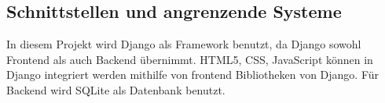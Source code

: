 \subsection{Schnittstellen und angrenzende Systeme} 
In diesem Projekt wird Django als Framework benutzt, da Django sowohl Frontend als auch Backend übernimmt. HTML5, CSS, JavaScript können in Django integriert werden mithilfe von frontend Bibliotheken von Django. Für Backend wird SQLite als Datenbank benutzt.